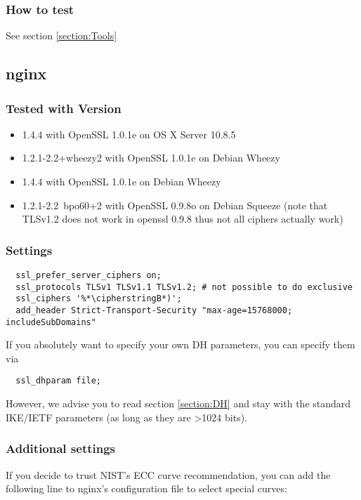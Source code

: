 \subsubsection{How to test} 
See section \ref{section:Tools}

\subsection{nginx}


\subsubsection{Tested with Version} 
\begin{itemize}
  \item 1.4.4 with OpenSSL 1.0.1e on OS X Server 10.8.5
  \item 1.2.1-2.2+wheezy2 with OpenSSL 1.0.1e on Debian Wheezy
  \item 1.4.4 with OpenSSL 1.0.1e on Debian Wheezy
  \item 1.2.1-2.2~bpo60+2 with OpenSSL 0.9.8o on Debian Squeeze (note that TLSv1.2 does not work in openssl 0.9.8 thus not all ciphers actually work)
\end{itemize}


\subsubsection{Settings}
\begin{lstlisting}
  ssl_prefer_server_ciphers on;
  ssl_protocols TLSv1 TLSv1.1 TLSv1.2; # not possible to do exclusive
  ssl_ciphers '%*\cipherstringB*)';
  add_header Strict-Transport-Security "max-age=15768000; includeSubDomains"
\end{lstlisting}

If you absolutely want to specify your own DH parameters, you can specify them via
\begin{lstlisting}
  ssl_dhparam file;
\end{lstlisting}

However, we advise you to read section \ref{section:DH} and stay with the standard IKE/IETF parameters (as long as they are \textgreater 1024 bits).


\vspace{0.5em} %
\subsubsection{Additional settings}
If you decide to trust NIST's ECC curve recommendation, you can add the following line to nginx's configuration file to select special curves:

